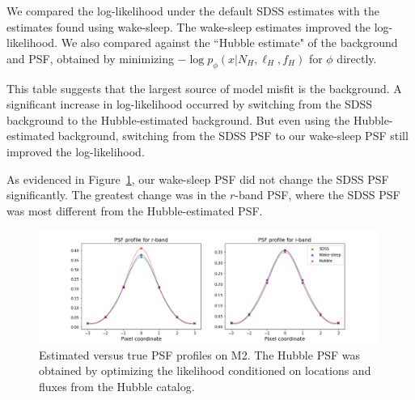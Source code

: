 We compared the log-likelihood under the default SDSS estimates with the estimates found using wake-sleep. The wake-sleep estimates improved the log-likelihood. We also compared against the ``Hubble estimate" of the background and PSF, obtained by minimizing 
$- \log p_\phi(x | N_{H}, \ell_{H}, f_{H})$ for $\phi$ directly. 

This table suggests that the largest source of model misfit is the background. A significant increase in log-likelihood occurred by switching from the SDSS background to the Hubble-estimated background. 
But even using the Hubble-estimated background, switching from the SDSS PSF to our wake-sleep PSF still improved the log-likelihood. 



As evidenced in Figure~\ref{fig:psf_profiles}, our wake-sleep PSF did not change the SDSS PSF significantly. The greatest change was in the $r$-band PSF, where the SDSS PSF was most different from the Hubble-estimated PSF. 

\begin{figure}[ht]
    \centering
    \includegraphics[width=0.99\textwidth]{figures/psf_profiles.png}
    \caption{Estimated versus true PSF profiles on M2. The Hubble PSF was
    obtained by optimizing the likelihood conditioned on locations and fluxes
    from the Hubble catalog. }
    \label{fig:psf_profiles}
\end{figure}



